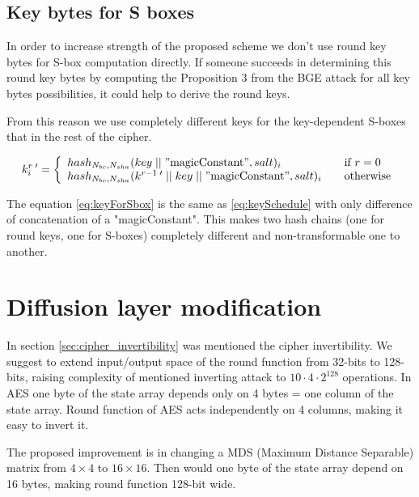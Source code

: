 \documentclass[11pt,oneside,final]{fithesis2}
\begin{document}
    \subsection{Key bytes for S boxes}
    In order to increase strength of the proposed scheme we don't use round key bytes for S-box computation directly. If someone succeeds in determining 
    this round key bytes by computing the Proposition 3 from the BGE attack for all key bytes possibilities, it could help to derive the round keys.
    
    From this reason we use completely different keys for the key-dependent S-boxes that in the rest of the cipher.

    \begin{equation}\label{eq:keyForSbox}
    k_i^{r \; \prime} = \left\{ 
    \begin{array}{l l} 
	hash_{N_{bc}, N_{sha}}(key\; || \; "\text{magicConstant}", salt)_i                              & \quad \text{if $r=0$}\\
	hash_{N_{bc}, N_{sha}}(k^{r-1 \; \prime} \; || \; key \; || \; "\text{magicConstant}", salt)_i            & \quad \text{otherwise}
    \end{array} \right.
    \end{equation}
    
    The equation \ref{eq:keyForSbox} is the same as \ref{eq:keySchedule} with only difference of concatenation of a "magicConstant". This makes 
    two hash chains (one for round keys, one for S-boxes) completely different and non-transformable one to another.
   
    \section{Diffusion layer modification}\label{sec:cipher_invert_improvement}
    In section \ref{sec:cipher_invertibility} was mentioned the cipher invertibility. We suggest to extend input/output space of the round function
    from 32-bits to 128-bits, raising complexity of mentioned inverting attack to $10\cdot4\cdot2^{128}$ operations. In AES one byte of the state array depends
    only on 4 bytes = one column of the state array. Round function of AES acts independently on 4 columns, making it easy to invert it. 

    The proposed improvement is in changing a MDS (Maximum Distance Separable) matrix from $4 \times 4$ to $16 \times 16$. 
    Then would one byte of the state array depend on 16 bytes, making round function 128-bit wide.
\end{document}
